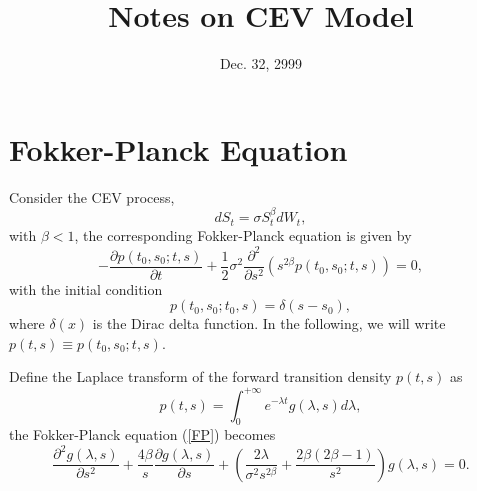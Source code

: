 \documentclass[12pt]{article}
\begin{document}
\title{Notes on CEV Model}
\date{Dec. 32, 2999}

\maketitle

\section{Fokker-Planck Equation}

  Consider the CEV process,
  \begin{equation}
    dS_t=\sigma S_t^{\beta}dW_t,
    \label{CEV}
  \end{equation}
  with $\beta < 1$, the corresponding Fokker-Planck equation is given by
  \begin{equation}
    -\frac{\partial p(t_0,s_0;t,s)}{\partial t}+\frac{1}{2}\sigma^2\frac{\partial^2}{\partial s^2}
    \left(s^{2\beta}p(t_0,s_0;t,s)\right) = 0,
    \label{FP}
  \end{equation}
  with the initial condition
  \begin{equation}
    p(t_0,s_0;t_0,s) = \delta(s-s_0),
    \label{initial}
  \end{equation}
  where $\delta(x)$ is the Dirac delta function. In the following, we will write $p(t,s)\equiv p(t_0,s_0;t,s)$.

  Define the Laplace transform of the forward transition density $p(t,s)$ as
  \begin{equation}
    p(t,s)=\int_0^{+\infty}e^{-\lambda t}g(\lambda, s)d\lambda,
    \label{Laplace}
  \end{equation}
  the Fokker-Planck equation (\ref{FP}) becomes
  \begin{equation}
    \frac{\partial^2g(\lambda,s)}{\partial s^2}+\frac{4\beta}{s}\frac{\partial g(\lambda,s)}{\partial s}
    + \left(\frac{2\lambda}{\sigma^2 s^{2\beta}}+\frac{2\beta(2\beta-1)}{s^2}\right)g(\lambda, s) = 0.
    \label{FP2}
  \end{equation}
\end{document}

